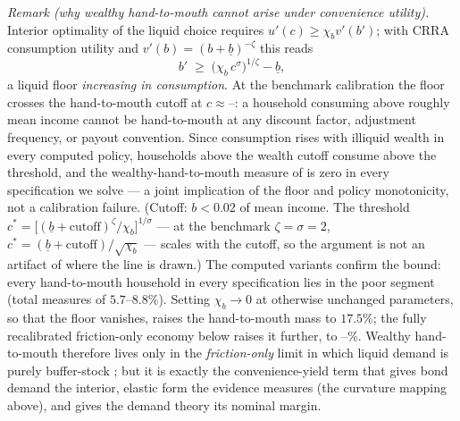 \documentclass[12pt]{article}
\providecommand{\pendingnum}{\textit{--}}
\providecommand{\OwnKVcThresh}{\pendingnum}
\providecommand{\KmvHtM}{\pendingnum}
\begin{document}
\medskip\noindent\emph{Remark (why wealthy hand-to-mouth cannot arise
under convenience utility).} Interior optimality of the liquid choice
requires $u'(c) \ge \chi_b v'(b')$; with CRRA consumption utility and
$v'(b) = (b + \underline{b})^{-\zeta}$ this reads
\[
b' \;\ge\; \big(\chi_b\, c^{\sigma}\big)^{1/\zeta} - \underline{b},
\]
a liquid floor \emph{increasing in consumption}. At the benchmark
calibration the floor crosses the hand-to-mouth cutoff at
$c \approx \OwnKVcThresh$: a household consuming above roughly mean
income cannot be hand-to-mouth at any discount factor, adjustment
frequency, or payout convention. Since consumption rises with illiquid
wealth in every computed policy, households above the wealth cutoff
consume above the threshold, and the wealthy-hand-to-mouth measure of
\citet{kaplanviolanteweidner2014} is zero in every specification we
solve --- a joint implication of the floor and policy monotonicity, not
a calibration failure. (Cutoff: $b < 0.02$ of mean income. The threshold
$c^*=\big[(\underline{b} + \text{cutoff})^{\zeta}/\chi_b\big]^{1/\sigma}$
--- at the benchmark $\zeta=\sigma=2$,
$c^*=(\underline{b}+\text{cutoff})/\sqrt{\chi_b}$ --- scales with the
cutoff, so
the argument is not an artifact of where the line is drawn.) The computed
variants confirm the bound: every hand-to-mouth
household in every specification lies in the poor segment (total measures
of $5.7$--$8.8\%$). Setting $\chi_b \to 0$ at otherwise unchanged
parameters, so that the floor vanishes, raises the hand-to-mouth mass to
$17.5\%$; the fully recalibrated friction-only economy below raises it
further, to $\KmvHtM\%$.
Wealthy hand-to-mouth therefore lives only in the \emph{friction-only}
limit in which liquid demand is purely buffer-stock \citep{kaplan2018};
but it is exactly the convenience-yield term that gives bond demand the
interior, elastic form the \citet{krishnamurthy2012} evidence measures
(the curvature mapping above), and
gives the demand theory its nominal margin.
\end{document}
